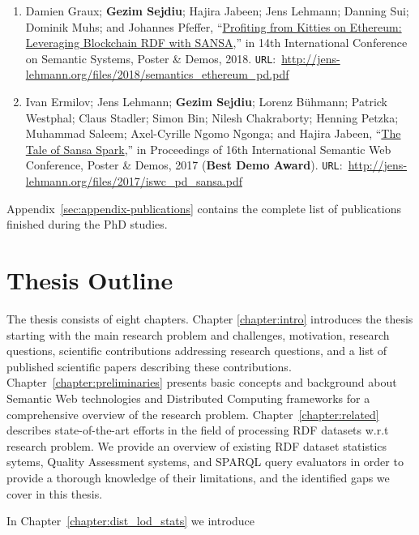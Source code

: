 \begin{itemize}
\begin{enumerate}
    \item Damien Graux; \textbf{Gezim Sejdiu}; Hajira Jabeen; Jens Lehmann; Danning Sui; Dominik Muhs; and Johannes Pfeffer, “\href{http://jens-lehmann.org/files/2018/semantics_ethereum_pd.pdf}{Profiting from Kitties on Ethereum: Leveraging Blockchain RDF with SANSA},” in 14th International Conference on Semantic Systems, Poster \& Demos, 2018. \texttt{URL}:~\url{http://jens-lehmann.org/files/2018/semantics_ethereum_pd.pdf}
    
    \item Ivan Ermilov; Jens Lehmann; \textbf{Gezim Sejdiu}; Lorenz Bühmann; Patrick Westphal; Claus Stadler; Simon Bin; Nilesh Chakraborty; Henning Petzka; Muhammad Saleem; Axel-Cyrille Ngomo Ngonga; and Hajira Jabeen, “\href{http://jens-lehmann.org/files/2017/iswc_pd_sansa.pdf}{The Tale of Sansa Spark},” in Proceedings of 16th International Semantic Web Conference, Poster \& Demos, 2017 ({\color{darkred}\textbf{Best Demo Award}}). \texttt{URL}:~\url{http://jens-lehmann.org/files/2017/iswc_pd_sansa.pdf}
        
    \end{enumerate}
\end{itemize}

Appendix~\ref{sec:appendix-publications} contains the complete list of publications finished during the PhD studies.

\section{Thesis Outline}
\label{sec:thesis-structure}
The thesis consists of eight chapters. 
Chapter \ref{chapter:intro} introduces the thesis starting with the main research problem and challenges, motivation, research questions, scientific contributions addressing research questions, and a list of published scientific papers describing these contributions.
Chapter~\ref{chapter:preliminaries} presents basic concepts and background about Semantic Web technologies and Distributed Computing frameworks for a comprehensive overview of the research problem. 
Chapter~\ref{chapter:related} describes state-of-the-art efforts in the field of processing \gls{RDF} datasets w.r.t research problem.
We provide an overview of existing RDF dataset statistics sytems, Quality Assessment systems, and SPARQL query evaluators in order to provide a thorough knowledge of their limitations, and the identified gaps we cover in this thesis.

In Chapter~\ref{chapter:dist_lod_stats} we introduce 
